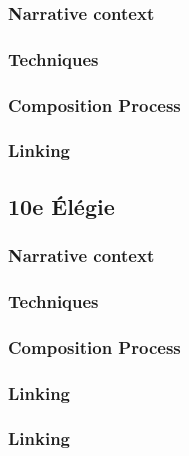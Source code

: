 \documentclass[12pt,twoside,maitrise]{dms}
\theoremstyle{definition}
\begin{document}
\subsubsection{Narrative context}

\subsubsection{Techniques}

\subsubsection{Composition Process}

\subsubsection{Linking}

\subsection{10e Élégie}

\subsubsection{Narrative context}

\subsubsection{Techniques}

\subsubsection{Composition Process}

\subsubsection{Linking}

\subsubsection{Linking}




\end{document}
